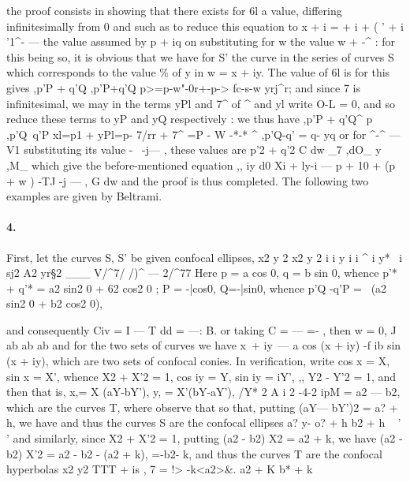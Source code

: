 \documentclass[11pt,a4paper]{book}
\begin{document}
{{{{{{the  proof  consists  in  showing  that  there  exists  for  6l  a  value,  differing  infinitesimally
from  0  and  such  as  to  reduce  this  equation  to
x  +  i     =     +  i   +  (   '  +  i  '1^-  ---
the  value  assumed  by  p  +  iq  on  substituting  for  w  the  value  w  +  -^ :  for  this  being
so,  it  is  obvious  that  we  have  for  S'  the  curve  in  the  series  of  curves  S  which
corresponds  to  the  value  \%  of  y  in  w  =  x  +  iy.  The  value  of  6l  is
for  this  gives
,p'P  +  q'Q  ,p'P+q'Q
p>=p-w"-0r+-p->  fc-s-w  yrj^r;
and    since    7    is   infinitesimal,   we   may   in   the   terms   yPl   and   7^   of  ^   and   yl   write
O-L  =  0,  and  so  reduce  these  terms  to  yP  and  yQ  respectively  :   we  thus  have
,p'P  +  q'Q^    p  ,p'Q~q'P
xl=p1  +  yPl=p-  7/rr  +  7^    =P  -  W  -*-*
^  ,p'Q-q'
=  q-  yq
or  for  ^-^ --- V1  substituting  its  value  -~  -j---  ,  these  values  are
p'2  +  q'2  C  dw
\_7    ,dO\_  y    ,M\_
which  give  the  before-mentioned  equation
,,  iy  d0
Xi  +  ly-i  ---  p  + 10  +  (p  +  w )  -TJ  -j ---  ,
G  dw
and  the  proof  is  thus  completed.
The  following  two  examples  are  given  by  Beltrami.
\paragraph{4.} First,  let  the  curves  S,  S'  be  given  confocal  ellipses,
x2     y 2                 x2              y 2
i    i  y  i    i       ^   i       y*~   i
sj2  A2  yr\S2  \_\_\_  V/^7/          /)^  ---  2/^77
Here
p  =  a  cos  0,     q  =  b  sin  0,
whence
p'*  +  q'*  =  a2  sin2  0  +  62  cos2  0 ;
P  =  -|cos0,     Q=-|sin0,
whence
p'Q  -q'P  =  \
(a2  sin2  0  +  b2  cos2  0),


and  consequently
Civ  =  I  --- T  dd  =  ---:  B.   or   taking   C  =  --- =- ,    then   w  =  0,
J  ab          ab  ab
and  for  the  two  sets  of  curves  we  have
x\  +  iy\  ---  a  cos  (x  +  iy)  -f  ib  sin  (x  +  iy),
which  are  two  sets  of  confocal  conies.     In  verification,  write
cos  x  =  X,     sin  x  =  X',     whence     X2  +  X'2  =  1,
cos  iy  =  Y,    sin  iy  =  iY',          ,,          Y2  -  Y'2  =  1,
and  then
that  is,
x,=  X  (aY-bY'),
y,  =  X'(bY-aY'),
/Y*  2  A  i  2
-4-2  ipM         =  a2  ---  b2,  which  are  the  curves  T,
where  observe  that
so  that,  putting  (aY---  bY')2  =  a?  +  h,  we  have
and  thus  the  curves  S  are  the  confocal  ellipses
a?  y-
o?  +  h     b2  +  h  ~    '  '
and  similarly,  since  X2  +  X'2  =  1,  putting  (a2  -  b2)  X2  =  a2  +  k,  we  have
(a2  -  b2)  X'2  =  a2  -  b2  -  (a2  +  k),     =-b2-  k,
and  thus  the  curves  T  are  the  confocal  hyperbolas
x2  y2
TTT  +  is  ,    7  =  !>     -k<a2>\&.
a2  +  K     b*  +  k
}}}}}}
\end{document}
